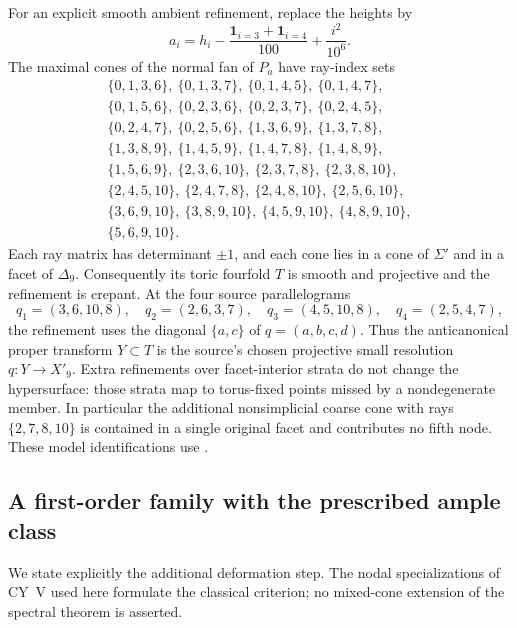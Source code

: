 For an explicit smooth ambient refinement, replace the heights by
\begin{equation}\label{eq:x9-fine-height}
 a_i=h_i-\frac{\mathbf1_{i=3}+\mathbf1_{i=4}}{100}
             +\frac{i^2}{10^6}.
\end{equation}
The maximal cones of the normal fan of $P_a$ have ray-index sets
\begin{equation}\label{eq:x9-fine-fan}
\begin{gathered}
\{0,1,3,6\},\ \{0,1,3,7\},\ \{0,1,4,5\},\ \{0,1,4,7\},\\
\{0,1,5,6\},\ \{0,2,3,6\},\ \{0,2,3,7\},\ \{0,2,4,5\},\\
\{0,2,4,7\},\ \{0,2,5,6\},\ \{1,3,6,9\},\ \{1,3,7,8\},\\
\{1,3,8,9\},\ \{1,4,5,9\},\ \{1,4,7,8\},\ \{1,4,8,9\},\\
\{1,5,6,9\},\ \{2,3,6,10\},\ \{2,3,7,8\},\ \{2,3,8,10\},\\
\{2,4,5,10\},\ \{2,4,7,8\},\ \{2,4,8,10\},\ \{2,5,6,10\},\\
\{3,6,9,10\},\ \{3,8,9,10\},\ \{4,5,9,10\},\ \{4,8,9,10\},\\
\{5,6,9,10\}.
\end{gathered}
\end{equation}
Each ray matrix has determinant $\pm1$, and each cone lies in a cone
of $\Sigma'$ and in a facet of $\Delta_9$. Consequently its toric
fourfold $T$ is smooth and projective and the refinement is crepant.
At the four source parallelograms
\begin{equation}\label{eq:x9-nodes}
 q_1=(3,6,10,8),\quad q_2=(2,6,3,7),\quad
 q_3=(4,5,10,8),\quad q_4=(2,5,4,7),
\end{equation}
the refinement uses the diagonal $\{a,c\}$ of $q=(a,b,c,d)$.
Thus the anticanonical proper transform $Y\subset T$ is the source's
chosen projective small resolution $q:Y\to X'_9$.
Extra refinements over facet-interior strata do not change the
hypersurface: those strata map to torus-fixed points missed by a
nondegenerate member. In particular the additional nonsimplicial
coarse cone with rays $\{2,7,8,10\}$ is contained in a single original
facet and contributes no fifth node. These model identifications use
\cite[Proposition~3.4]{wuebben-cy-mirror}.

\subsection{A first-order family with the prescribed ample class}
We state explicitly the additional deformation step. The nodal
specializations of CY~V used here formulate the classical criterion;
no mixed-cone extension of the spectral theorem is asserted.

